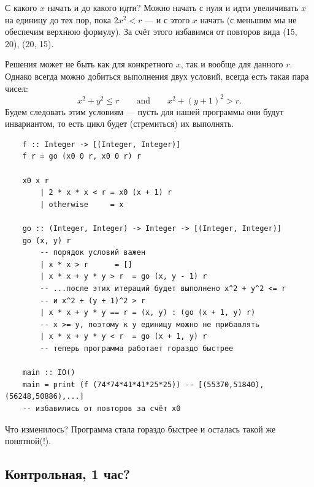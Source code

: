 \documentclass{book}
\begin{document}
С какого $x$ начать и до какого идти? Можно начать с нуля и идти увеличивать $x$ на единицу до тех
пор, пока $2 x^2 < r$ --- и с этого $x$ начать (с меньшим мы не обеспечим верхнюю формулу). За счёт
этого избавимся от повторов вида (15, 20), (20, 15).

Решения может не быть как для конкретного $x$, так и вообще для данного $r$. Однако всегда можно
добиться выполнения двух условий, всегда есть такая пара чисел:
\begin{equation}
    x^2 + y^2 \leq r \qquad \text{and} \qquad x^2 + (y + 1)^2 > r.
\end{equation}
Будем следовать этим условиям --- пусть для нашей программы они будут инвариантом, то есть цикл
будет (стремиться) их выполнять.
\begin{verbatim}
    f :: Integer -> [(Integer, Integer)]
    f r = go (x0 0 r, x0 0 r) r

    x0 x r
        | 2 * x * x < r = x0 (x + 1) r
        | otherwise     = x

    go :: (Integer, Integer) -> Integer -> [(Integer, Integer)]
    go (x, y) r
        -- порядок условий важен
        | x * x > r      = []
        | x * x + y * y > r  = go (x, y - 1) r
        -- ...после этих итераций будет выполнено x^2 + y^2 <= r
        -- и x^2 + (y + 1)^2 > r
        | x * x + y * y == r = (x, y) : (go (x + 1, y) r)
        -- x >= y, поэтому к y единицу можно не прибавлять
        | x * x + y * y < r  = go (x + 1, y) r
        -- теперь программа работает гораздо быстрее

    main :: IO()
    main = print (f (74*74*41*41*25*25)) -- [(55370,51840),(56248,50886),...]
    -- избавились от повторов за счёт x0
\end{verbatim}

Что изменилось? Программа стала гораздо быстрее и осталась такой же понятной(!).

\subsection{Контрольная, 1 час?}
\end{document}
